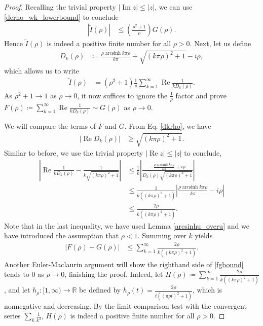 \documentclass{amsart}
\theoremstyle{plain}
\numberwithin{theorem}{section}
\DeclareMathOperator{\arcsinh}{arcsinh}
\DeclareMathOperator{\Rez}{Re}
\DeclareMathOperator{\Imz}{Im}
\theoremstyle{definition}
\theoremstyle{remark}
\theoremstyle{brakets}
\newcommand{\R}{\mathbb{R}}
\begin{document}
\begin{proof} 
\noindent Recalling the trivial property $\left|\Imz z\right| \leq |z|$, we can use \ref{derho_wk_lowerbound} to conclude
\begin{align}
    |\tilde{I}(\rho)| &\leq \left( \frac{\rho^2 +1}{\rho} \right) G(\rho). \label{Itilde_absolutebound}
\end{align}
Hence $\tilde{I}(\rho)$ is indeed a positive finite number for all $\rho > 0$. Next, let us define
\begin{align}\label{dkrho}
    D_k(\rho) &\coloneq \frac{\rho \arcsinh k \pi \rho}{k\pi} + \sqrt{(k\pi\rho)^2 + 1} - i\rho,
\end{align}
\noindent which allows us to write
\begin{align*}
    \tilde{I}(\rho) &= (\rho^2 + 1)\frac{1}{\rho}\sum\limits_{k=1}^\infty \Rez \frac{1}{kD_k(\rho)}.
\end{align*}
\noindent As $\rho^2 + 1 \to 1$ as $\rho \to 0$, it now suffices to ignore the $\frac{1}{\rho}$ factor and prove $F(\rho) \coloneq\sum\limits_{k = 1}^\infty \Rez \frac{1}{kD_k(\rho)} \sim G(\rho)$ as $\rho \to 0$.

\noindent We will compare the terms of $F$ and $G$. From Eq. \ref{dkrho}, we have
\begin{align*}
    |\Rez D_k(\rho)| &\geq \sqrt{(k\pi\rho)^2 + 1}.
\end{align*}
\noindent Similar to before, we use the trivial property $\left|\Rez z \right| \leq |z|$ to conclude,
\begin{align*}
    \left| \Rez \frac{1}{kD_k(\rho)} - \frac{1}{k\sqrt{(k\pi\rho)^2 + 1}} \right| &\leq \frac{1}{k} \left| \frac{ -\frac{\rho \arcsinh k \pi \rho}{k \pi} + i\rho}{D_k(\rho)\sqrt{(k\pi\rho)^2 + 1}} \right| \\
    &\leq \frac{1}{k((k\pi\rho)^2 + 1)} \left|\frac{\rho \arcsinh k \pi \rho}{k \pi} - i\rho \right| \\
    &\leq \frac{2\rho}{k((k\pi\rho)^2 + 1)}.
\end{align*}
Note that in the last inequality, we have used Lemma \ref{arcsinhu_overu} and we have introduced the assumption that $\rho < 1$. Summing over $k$ yields
\begin{align}\label{fgbound}
    |F(\rho) - G(\rho)| &\leq  \sum\limits_{k= 1}^\infty \frac{2\rho}{k((k\pi\rho)^2 + 1)}.
\end{align}
Another Euler-Maclaurin argument will show the righthand side of \eqref{fgbound} tends to $0$ as $\rho \to 0$, finishing the proof. Indeed, let $H(\rho) \coloneq  \sum\limits_{k= 1}^\infty \frac{2\rho}{k((k\pi\rho)^2 + 1)}$, and let $h_\rho: [1,\infty) \to \R$ be defined by $h_\rho(t) = \frac{2\rho}{t((\pi\rho t)^2 + 1)}$, which is nonnegative and decreasing. By the limit comparison test with the convergent series $\sum\limits_{k} \frac{1}{k^3}$, $H(\rho)$ is indeed a positive finite number for all $\rho > 0$. 


\end{proof}
\end{document}
